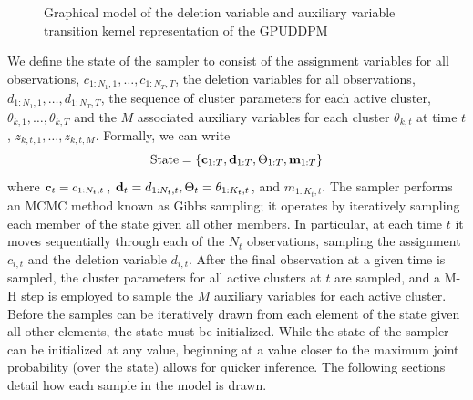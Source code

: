 \documentclass[smallcondensed, final]{svjour3}
\begin{document}
\begin{figure}[h]
        \caption{Graphical model of the deletion variable and auxiliary variable transition kernel representation of the GPUDDPM}
        \label{fig:gpuddpm_gm_2}
\end{figure}

We define the state of the sampler to consist of the assignment variables for all observations, $c_{1:N_{1},1}, \ldots, c_{1:N_{T}, T}$, the deletion variables for all observations, $d_{1:N_{1},1}, \ldots, d_{1:N_{T}, T}$, the sequence of cluster parameters for each active cluster, $\theta_{k,1}, \ldots, \theta_{k, T}$ and the $M$ associated auxiliary variables for each cluster $\theta_{k,t}$ at time $t$, $z_{k,t,1}, \ldots, z_{k, t, M}$. Formally, we can write
\begin{equation}
\text{State} = \{ \bold{c}_{1:T}, \bold{d}_{1:T}, \Theta_{1:T}, \bold{m}_{1:T} \}
\end{equation}
where $\bold{c}_{t} = c_{1:N_{t},t}$, $\bold{d}_{t} = d_{1:N_{t},t}, \Theta_{t} = \theta_{1:K_{t}, t}$, and $m_{1:K_{t},t}$.
The sampler performs an MCMC method known as Gibbs sampling; it operates by iteratively sampling each member of the state given all other members. In particular, at each time $t$ it moves sequentially through each of the $N_{t}$ observations, sampling the assignment $c_{i,t}$ and the deletion variable $d_{i,t}$. After the final observation at a given time is sampled, the cluster parameters for all active clusters at $t$ are sampled, and a M-H step is employed to sample the $M$ auxiliary variables for each active cluster. Before the samples can be iteratively drawn from each element of the state given all other elements, the state must be initialized. While the state of the sampler can be initialized at any value, beginning at a value closer to the maximum joint probability (over the state) allows for quicker inference. The following sections detail how each sample in the model is drawn.
\end{document}
